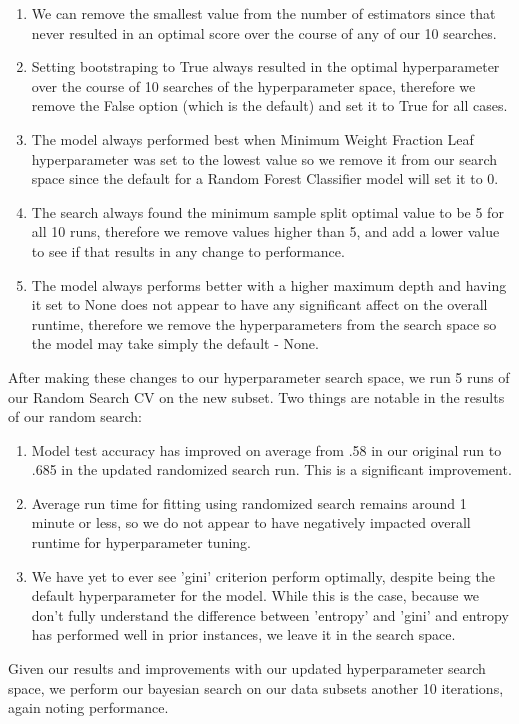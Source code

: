 \documentclass[titlepage]{article}
\begin{document}
\begin{enumerate}
	\item We can remove the smallest value from the number of estimators since that never resulted in an optimal score over the course of any of our 10 searches. 
	\item Setting bootstraping to True always resulted in the optimal hyperparameter over the course of 10 searches of the hyperparameter space, therefore we remove the False option (which is the default) and set it to True for all cases.  
	\item The model always performed best when Minimum Weight Fraction Leaf hyperparameter was set to the lowest value so we remove it from our search space since the default for a Random Forest Classifier model will set it to 0.  
	\item The search always found the minimum sample split optimal value to be 5 for all 10 runs, therefore we remove values higher than 5, and add a lower value to see if that results in any change to performance. 
	\item The model always performs better with a higher maximum depth and having it set to None does not appear to have any significant affect on the overall runtime, therefore we remove the hyperparameters from the search space so the model may take simply the default - None.   
\end{enumerate}

After making these changes to our hyperparameter search space, we run 5 runs of our Random Search CV on the new subset.  Two things are notable in the results of our random search:
\begin{enumerate}
	\item Model test accuracy has improved on average from .58 in our original run to .685 in the updated randomized search run.  This is a significant improvement.
	\item Average run time for fitting using randomized search remains around 1 minute or less, so we do not appear to have negatively impacted overall runtime for hyperparameter tuning.  
	\item We have yet to ever see 'gini' criterion perform optimally, despite being the default hyperparameter for the model.  While this is the case, because we don't fully understand the difference between 'entropy' and 'gini' and entropy has performed well in prior instances, we leave it in the search space.  
\end{enumerate}
Given our results and improvements with our updated hyperparameter search space, we perform our bayesian search on our data subsets another 10 iterations, again noting performance.  
\end{document}
